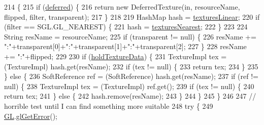 \begin{DoxyCode}
214                                                                                                            
                                     \{
215         \textcolor{keywordflow}{if} (\mbox{\hyperlink{classorg_1_1newdawn_1_1slick_1_1opengl_1_1_internal_texture_loader_afde58d084fb7c587c15b674005617ff4}{deferred}}) \{
216             \textcolor{keywordflow}{return} \textcolor{keyword}{new} DeferredTexture(in, resourceName, flipped, filter, transparent);
217         \}
218         
219         HashMap hash = \mbox{\hyperlink{classorg_1_1newdawn_1_1slick_1_1opengl_1_1_internal_texture_loader_af5ded371f9b982d890be25766fb2ba46}{texturesLinear}};
220         \textcolor{keywordflow}{if} (filter == SGL.GL\_NEAREST) \{
221             hash = \mbox{\hyperlink{classorg_1_1newdawn_1_1slick_1_1opengl_1_1_internal_texture_loader_a2212ea841053c4380293000579d0a068}{texturesNearest}};
222         \}
223         
224         String resName = resourceName;
225         \textcolor{keywordflow}{if} (transparent != null) \{
226             resName += \textcolor{stringliteral}{":"}+transparent[0]+\textcolor{stringliteral}{":"}+transparent[1]+\textcolor{stringliteral}{":"}+transparent[2];
227         \}
228         resName += \textcolor{stringliteral}{":"}+flipped;
229         
230         \textcolor{keywordflow}{if} (\mbox{\hyperlink{classorg_1_1newdawn_1_1slick_1_1opengl_1_1_internal_texture_loader_a45b8c17af18ad5095972b3f519eb17bd}{holdTextureData}}) \{
231             TextureImpl tex = (TextureImpl)  hash.get(resName);
232             \textcolor{keywordflow}{if} (tex != null) \{
233                 \textcolor{keywordflow}{return} tex;
234             \}
235         \} \textcolor{keywordflow}{else} \{
236             SoftReference ref = (SoftReference) hash.get(resName);
237             \textcolor{keywordflow}{if} (ref != null) \{
238                 TextureImpl tex = (TextureImpl) ref.get();
239                 \textcolor{keywordflow}{if} (tex != null) \{
240                     \textcolor{keywordflow}{return} tex;
241                 \} \textcolor{keywordflow}{else} \{
242                     hash.remove(resName);
243                 \}
244             \}
245         \}
246         
247         \textcolor{comment}{// horrible test until I can find something more suitable}
248         \textcolor{keywordflow}{try} \{
249             \mbox{\hyperlink{classorg_1_1newdawn_1_1slick_1_1opengl_1_1_internal_texture_loader_a302f0e97810ce583189425dd693ae4c2}{GL}}.\mbox{\hyperlink{interfaceorg_1_1newdawn_1_1slick_1_1opengl_1_1renderer_1_1_s_g_l_ad629cdbc2f5bd7148fad9c93b778ff47}{glGetError}}();

\end{DoxyCode}
